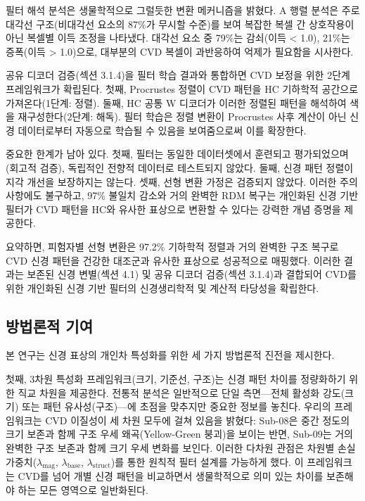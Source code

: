 \documentclass[12pt,a4paper]{article}
\begin{document}
필터 해석 분석은 생물학적으로 그럴듯한 변환 메커니즘을 밝혔다. A 행렬 분석은 주로 대각선 구조(비대각선 요소의 87\%가 무시할 수준)를 보여 복잡한 복셀 간 상호작용이 아닌 복셀별 이득 조정을 나타냈다. 대각선 요소 중 79\%는 감쇠(이득 < 1.0), 21\%는 증폭(이득 > 1.0)으로, 대부분의 CVD 복셀이 과반응하여 억제가 필요함을 시사한다.

공유 디코더 검증(섹션 3.1.4)을 필터 학습 결과와 통합하면 CVD 보정을 위한 2단계 프레임워크가 확립된다. 첫째, Procrustes 정렬이 CVD 패턴을 HC 기하학적 공간으로 가져온다(1단계: 정렬). 둘째, HC 공통 W 디코더가 이러한 정렬된 패턴을 해석하여 색을 재구성한다(2단계: 해독). 필터 학습은 정렬 변환이 Procrustes 사후 계산이 아닌 신경 데이터로부터 자동으로 학습될 수 있음을 보여줌으로써 이를 확장한다.

중요한 한계가 남아 있다. 첫째, 필터는 동일한 데이터셋에서 훈련되고 평가되었으며(회고적 검증), 독립적인 전향적 데이터로 테스트되지 않았다. 둘째, 신경 패턴 정렬이 지각 개선을 보장하지는 않는다. 셋째, 선형 변환 가정은 검증되지 않았다. 이러한 주의사항에도 불구하고, 97\% 불일치 감소와 거의 완벽한 RDM 복구는 개인화된 신경 기반 필터가 CVD 패턴을 HC와 유사한 표상으로 변환할 수 있다는 강력한 개념 증명을 제공한다.

요약하면, 피험자별 선형 변환은 97.2\% 기하학적 정렬과 거의 완벽한 구조 복구로 CVD 신경 패턴을 건강한 대조군과 유사한 표상으로 성공적으로 매핑했다. 이러한 결과는 보존된 신경 변별(섹션 4.1) 및 공유 디코더 검증(섹션 3.1.4)과 결합되어 CVD를 위한 개인화된 신경 기반 필터의 신경생리학적 및 계산적 타당성을 확립한다.

\subsection{방법론적 기여}

본 연구는 신경 표상의 개인차 특성화를 위한 세 가지 방법론적 진전을 제시한다.

첫째, 3차원 특성화 프레임워크(크기, 기준선, 구조)는 신경 패턴 차이를 정량화하기 위한 직교 차원을 제공한다. 전통적 분석은 일반적으로 단일 측면—전체 활성화 강도(크기) 또는 패턴 유사성(구조)—에 초점을 맞추지만 중요한 정보를 놓친다. 우리의 프레임워크는 CVD 이질성이 세 차원 모두에 걸쳐 있음을 밝혔다: Sub-08은 중간 정도의 크기 보존과 함께 구조 우세 왜곡(Yellow-Green 붕괴)을 보이는 반면, Sub-09는 거의 완벽한 구조 보존과 함께 크기 우세 변화를 보인다. 이러한 다차원 관점은 차원별 손실 가중치($\lambda_{\text{mag}}$, $\lambda_{\text{base}}$, $\lambda_{\text{struct}}$)를 통한 원칙적 필터 설계를 가능하게 했다. 이 프레임워크는 CVD를 넘어 개별 신경 패턴을 비교하면서 생물학적으로 의미 있는 차이를 보존해야 하는 모든 영역으로 일반화된다.
\end{document}
